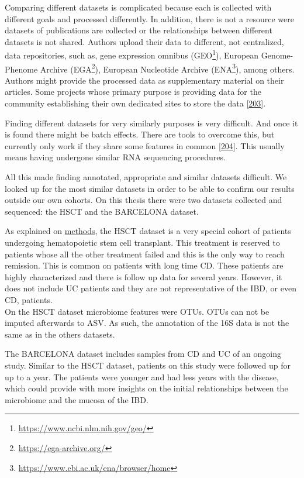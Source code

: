 \documentclass[
  a4paper,
]{book}
\DeclareRobustCommand{\href}[2]{#2\footnote{\url{#1}}}
\begin{document}
Comparing different datasets is complicated because each is collected with different goals and processed differently.
In addition, there is not a resource were datasets of publications are collected or the relationships between different datasets is not shared.
Authors upload their data to different, not centralized, data repositories, such as, gene expression omnibus (\href{https://www.ncbi.nlm.nih.gov/geo/}{GEO}), European Genome-Phenome Archive (\href{https://ega-archive.org/}{EGA}), European Nucleotide Archive (\href{https://www.ebi.ac.uk/ena/browser/home}{ENA}), among others.
Authors might provide the processed data as supplementary material on their articles.
Some projects whose primary purpose is providing data for the community establishing their own dedicated sites to store the data {[}\protect\hyperlink{ref-humanmicrobiomeprojectconsortium2012}{203}{]}.

Finding different datasets for very similarly purposes is very difficult.
And once it is found there might be batch effects.
There are tools to overcome this, but currently only work if they share some features in common {[}\protect\hyperlink{ref-ugidos2020}{204}{]}.
This usually means having undergone similar RNA sequencing procedures.

All this made finding annotated, appropriate and similar datasets difficult.
We looked up for the most similar datasets in order to be able to confirm our results outside our own cohorts.
On this thesis there were two datasets collected and sequenced: the HSCT and the BARCELONA dataset.

As explained on \protect\hyperlink{methods-hsct}{methods}, the HSCT dataset is a very special cohort of patients undergoing hematopoietic stem cell transplant.
This treatment is reserved to patients whose all the other treatment failed and this is the only way to reach remission.
This is common on patients with long time CD.
These patients are highly characterized and there is follow up data for several years.
However, it does not include UC patients and they are not representative of the IBD, or even CD, patients.\\
On the HSCT dataset microbiome features were OTUs.
OTUs can not be imputed afterwards to ASV.
As such, the annotation of the 16S data is not the same as in the others datasets.

The BARCELONA dataset includes samples from CD and UC of an ongoing study.
Similar to the HSCT dataset, patients on this study were followed up for up to a year.
The patients were younger and had less years with the disease, which could provide with more insights on the initial relationships between the microbiome and the mucosa of the IBD.
\end{document}
